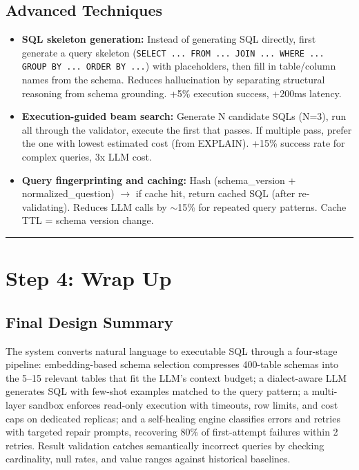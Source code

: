 \subsection*{Advanced Techniques}

\begin{itemize}
  \item \textbf{SQL skeleton generation:} Instead of generating SQL directly, first generate a query skeleton (\texttt{SELECT ... FROM ... JOIN ... WHERE ... GROUP BY ... ORDER BY ...}) with placeholders, then fill in table/column names from the schema. Reduces hallucination by separating structural reasoning from schema grounding. +5\% execution success, +200ms latency.
  \item \textbf{Execution-guided beam search:} Generate N candidate SQLs (N=3), run all through the validator, execute the first that passes. If multiple pass, prefer the one with lowest estimated cost (from EXPLAIN). +15\% success rate for complex queries, 3x LLM cost.
  \item \textbf{Query fingerprinting and caching:} Hash (schema\_version + normalized\_question) $\rightarrow$ if cache hit, return cached SQL (after re-validating). Reduces LLM calls by $\sim$15\% for repeated query patterns. Cache TTL = schema version change.
\end{itemize}

\bigskip\hrule\bigskip

\section*{Step 4: Wrap Up}

\subsection*{Final Design Summary}

The system converts natural language to executable SQL through a four-stage pipeline: embedding-based schema selection compresses 400-table schemas into the 5--15 relevant tables that fit the LLM's context budget; a dialect-aware LLM generates SQL with few-shot examples matched to the query pattern; a multi-layer sandbox enforces read-only execution with timeouts, row limits, and cost caps on dedicated replicas; and a self-healing engine classifies errors and retries with targeted repair prompts, recovering 80\% of first-attempt failures within 2 retries. Result validation catches semantically incorrect queries by checking cardinality, null rates, and value ranges against historical baselines.

